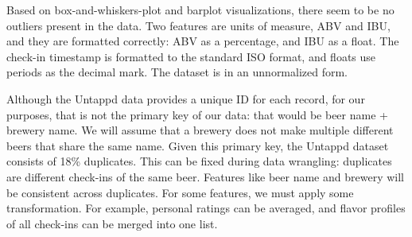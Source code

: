 \documentclass[sigconf, natbib=true]{acmart}
\begin{document}
Based on box-and-whiskers-plot and barplot visualizations, there seem to be no outliers present in the data.
Two features are units of measure, ABV and IBU, and they are formatted correctly: ABV as a percentage, and IBU as a float.
The check-in timestamp is formatted to the standard ISO format, and floats use periods as the decimal mark.
The dataset is in an unnormalized form.

Although the Untappd data provides a unique ID for each record, for our purposes, that is not the primary key of our data: that would be beer name + brewery name.
We will assume that a brewery does not make multiple different beers that share the same name.
Given this primary key, the Untappd dataset consists of 18\% duplicates.
This can be fixed during data wrangling: duplicates are different check-ins of the same beer.
Features like beer name and brewery will be consistent across duplicates.
For some features, we must apply some transformation. 
For example, personal ratings can be averaged, and flavor profiles of all check-ins can be merged into one list.


\end{document}
